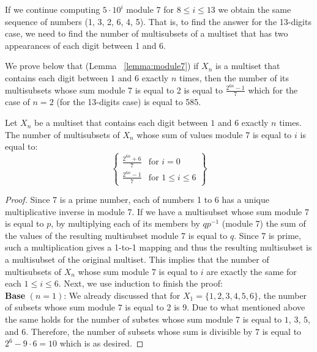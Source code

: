 \begin{solution}
If we continue computing $5 \cdot 10^i$ module 7 for $8 \leq i  \leq 13$ we obtain the same sequence of numbers (1, 3, 2, 6, 4, 5). That is, to find the answer for the 13-digits case, we need to find the number of multisubsets of a multiset that has two appearances of each digit between 1 and 6.

We prove below that (Lemma ~\ref{lemma:module7}) if $X_n$ is a multiset that contains each digit between $1$ and $6$ exactly $n$ times, then the number of its multisubsets whose sum module 7 is equal to 2 is equal to $
\frac{2^{6n}-1}{7}
$ which for the case of $n=2$ (for the 13-digits case) is equal to 585.

\begin{lemma}\label{lemma:module7}
Let $X_n$ be a multiset that contains each digit between $1$ and $6$ exactly $n$ times. The number of  multisubsets of $X_n$ whose sum of values module 7 is equal to $i$ is equal to:
$$
\left\{ \begin{array}{lr}
\frac{2^{6n}+6}{7} & \text{for } i=0\\
\frac{2^{6n}-1}{7} & \text{for } 1\leq i\leq 6
\end{array} \right\}
$$
\end{lemma}
\begin{proof}
Since 7 is a prime number, each of numbers 1 to 6 has a unique multiplicative inverse in module  7. If we have a multisubset whose sum module 7 is equal to  $p$, by multiplying each of its members by $qp^{-1}$ (module 7) the sum of the values of the resulting multisubset module 7 is equal to $q$. Since 7 is prime, such a multiplication gives a 1-to-1 mapping and thus the resulting multisubset is a multisubset of the original multiset. This implies that the number of multisubsets of $X_n$ whose sum module 7 is equal to $i$ are exactly the same for each $1 \leq i \leq 6$. Next, we use induction to finish the proof:\\[0.2cm]

\noindent \textbf{Base} $(n=1)$: We already discussed that for $X_1 = \{1,2,3,4,5,6\}$, the number of subsets whose sum module $7$ is equal to 2 is  9. Due to what mentioned above the same holds for the number of substes whose sum module 7 is equal to $1$, $3$, $5$, and $6$. Therefore, the number of subsets whose sum is divisible by $7$ is equal to $2^6-9\cdot 6=10$ which is as desired.


\end{proof}
\end{solution}

